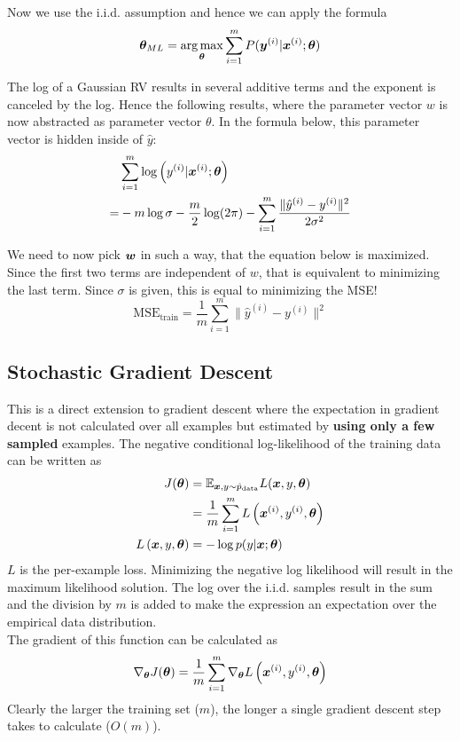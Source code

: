 \begin{multicols}{2}
	Now we use the i.i.d. assumption and hence we can apply the formula
	\[ \bol{\theta}_{ML} = \underset{\bol{\theta}}{\arg \max} \sum_{i=1}^{m} P(\bol{y}^{(i)}|\bol{x}^{(i)};\bol{\theta}) \]
	
	The log of a Gaussian RV results in several additive terms and the exponent is canceled by the log.
	Hence the following results, where the parameter vector $w$ is now abstracted as parameter vector $\theta$. 
	In the formula below, this parameter vector is hidden inside of $\hat{y}$:
	\begin{align*}
	&\sum_{i=1}^{m} \log \left(y^{(i)}|\bol{x}^{(i)};\bol{\theta}\right)\\
	= &-m\log\sigma - \frac{m}{2}\log(2\pi)-\sum_{i=1}^{m}\frac{\lVert\hat{y}^{(i)}-y^{(i)}\rVert^2}{2\sigma^2}
	\end{align*}
	
	We need to now pick $\bol{w}$ in such a way, that the equation below is maximized. 
	Since the first two terms are independent of $w$, that is equivalent to minimizing the last term. 
	Since $\sigma$ is given, this is equal to minimizing the MSE!
	\[ \text{MSE}_{\text{train}}=\frac{1}{m}\sum_{i=1}^{m}\lVert \hat{y}^{(i)}-y^{(i)}\rVert^2 \]
	
	\subsection{Stochastic Gradient Descent}
	This is a direct extension to gradient descent where the expectation in gradient decent is not calculated over all examples but estimated by \textbf{using only a few sampled} examples.
	The negative conditional log-likelihood of the training data can be written as
	\begin{align*}
	J(\bol{\theta}) &= \Exp_{\bol{x},y\sim \hat{p}_{\text{data}}} L(\vx,y,\bol{\theta})\\
	&= \frac{1}{m} \sum_{i=1}^m L\left(\vx^{(i)},y^{(i)},\bol{\theta}\right)\\
	L\left(\vx,y,\bol{\theta}\right) &= -\log p(y|\vx;\bol{\theta})
	\end{align*}
	$L$ is the per-example loss. Minimizing the negative log likelihood will result in the maximum likelihood solution.
	The log over the i.i.d. samples result in the sum and the division by $m$ is added to make the expression an expectation over the empirical data distribution.\\
	The gradient of this function can be calculated as
	\[ \nabla_{\bol{\theta}}J(\bol{\theta}) = \frac{1}{m}\sum_{i=1}^{m}\nabla_\bolt L\left(\vx^{(i)},y^{(i)},\bolt\right) \]
	Clearly the larger the training set ($m$), the longer a single gradient descent step takes to calculate ($O(m)$).\\
	

\end{multicols}

